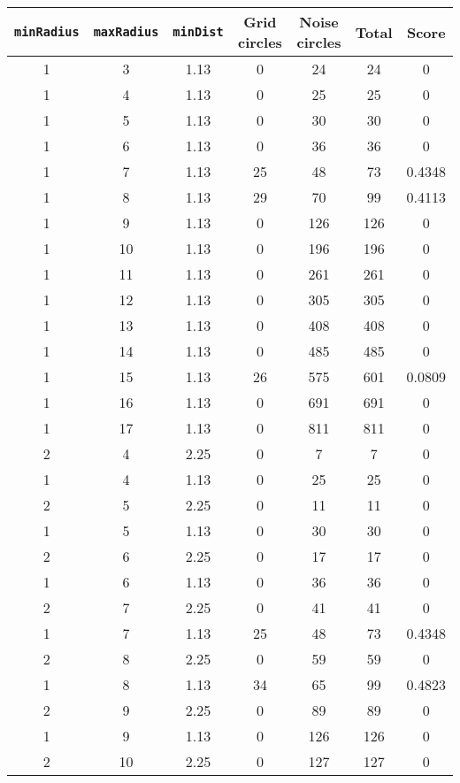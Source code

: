 \documentclass[letterpaper, 12pt]{article}
\begin{document}
\begin{longtable}{|c|c|c|c|c|c|c|}
\hline
\textbf{\texttt{minRadius}} & \textbf{\texttt{maxRadius}} & \textbf{\texttt{minDist}} & \textbf{Grid circles} & \textbf{Noise circles} & \textbf{Total} & \textbf{Score} \\
\hline
1 & 3 & 1.13 & 0 & 24 & 24 & 0 \\
\hline
1 & 4 & 1.13 & 0 & 25 & 25 & 0 \\
\hline
1 & 5 & 1.13 & 0 & 30 & 30 & 0 \\
\hline
1 & 6 & 1.13 & 0 & 36 & 36 & 0 \\
\hline
1 & 7 & 1.13 & 25 & 48 & 73 & 0.4348 \\
\hline
1 & 8 & 1.13 & 29 & 70 & 99 & 0.4113 \\
\hline
1 & 9 & 1.13 & 0 & 126 & 126 & 0 \\
\hline
1 & 10 & 1.13 & 0 & 196 & 196 & 0 \\
\hline
1 & 11 & 1.13 & 0 & 261 & 261 & 0 \\
\hline
1 & 12 & 1.13 & 0 & 305 & 305 & 0 \\
\hline
1 & 13 & 1.13 & 0 & 408 & 408 & 0 \\
\hline
1 & 14 & 1.13 & 0 & 485 & 485 & 0 \\
\hline
1 & 15 & 1.13 & 26 & 575 & 601 & 0.0809 \\
\hline
1 & 16 & 1.13 & 0 & 691 & 691 & 0 \\
\hline
1 & 17 & 1.13 & 0 & 811 & 811 & 0 \\
\hline
2 & 4 & 2.25 & 0 & 7 & 7 & 0 \\
\hline
1 & 4 & 1.13 & 0 & 25 & 25 & 0 \\
\hline
2 & 5 & 2.25 & 0 & 11 & 11 & 0 \\
\hline
1 & 5 & 1.13 & 0 & 30 & 30 & 0 \\
\hline
2 & 6 & 2.25 & 0 & 17 & 17 & 0 \\
\hline
1 & 6 & 1.13 & 0 & 36 & 36 & 0 \\
\hline
2 & 7 & 2.25 & 0 & 41 & 41 & 0 \\
\hline
1 & 7 & 1.13 & 25 & 48 & 73 & 0.4348 \\
\hline
2 & 8 & 2.25 & 0 & 59 & 59 & 0 \\
\hline
1 & 8 & 1.13 & 34 & 65 & 99 & 0.4823 \\
\hline
2 & 9 & 2.25 & 0 & 89 & 89 & 0 \\
\hline
1 & 9 & 1.13 & 0 & 126 & 126 & 0 \\
\hline
2 & 10 & 2.25 & 0 & 127 & 127 & 0 \\

\end{longtable}
\end{document}
